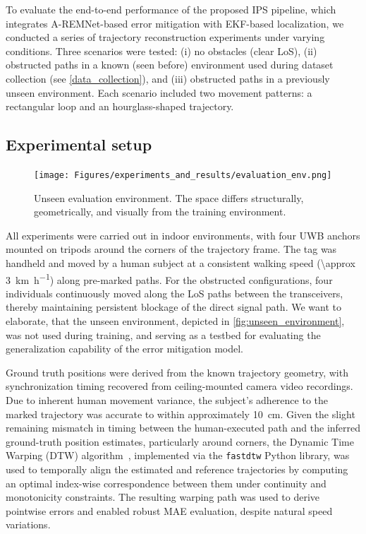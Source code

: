 To evaluate the end-to-end performance of the proposed IPS pipeline, which integrates A-REMNet-based error mitigation with EKF-based localization, we conducted a series of trajectory reconstruction experiments under varying conditions. Three scenarios were tested: (i) no obstacles (clear LoS), (ii) obstructed paths in a known (seen before) environment used during dataset collection (see \autoref{data_collection}), and (iii) obstructed paths in a previously unseen environment. Each scenario included two movement patterns: a rectangular loop and an hourglass-shaped trajectory.

\subsection{Experimental setup}

\begin{figure}[tbh]
    \centering
    \texttt{[image: Figures/experiments\_and\_results/evaluation\_env.png]}
    \caption[Unseen evaluation environment.]{Unseen evaluation environment. The space differs structurally, geometrically, and visually from the training environment.}
    \label{fig:unseen_environment}
\end{figure}

All experiments were carried out in indoor environments, with four UWB anchors mounted on tripods around the corners of the trajectory frame. The tag was handheld and moved by a human subject at a consistent walking speed (\SI[per-mode=symbol]{\approx 3}{\kilo\metre\per\hour}) along pre-marked paths. For the obstructed configurations, four individuals continuously moved along the LoS paths between the transceivers, thereby maintaining persistent blockage of the direct signal path. We want to elaborate, that the unseen environment, depicted in \autoref{fig:unseen_environment}, was not used during training, and serving as a testbed for evaluating the generalization capability of the error mitigation model.

Ground truth positions were derived from the known trajectory geometry, with synchronization timing recovered from ceiling-mounted camera video recordings. Due to inherent human movement variance, the subject's adherence to the marked trajectory was accurate to within approximately \SI{10}{\centi\meter}. Given the slight remaining mismatch in timing between the human-executed path and the inferred ground-truth position estimates, particularly around corners, the Dynamic Time Warping (DTW) algorithm~\cite{dtw}, implemented via the \texttt{fastdtw} Python library, was used to temporally align the estimated and reference trajectories by computing an optimal index-wise correspondence between them under continuity and monotonicity constraints. The resulting warping path was used to derive pointwise errors and enabled robust MAE evaluation, despite natural speed variations.

